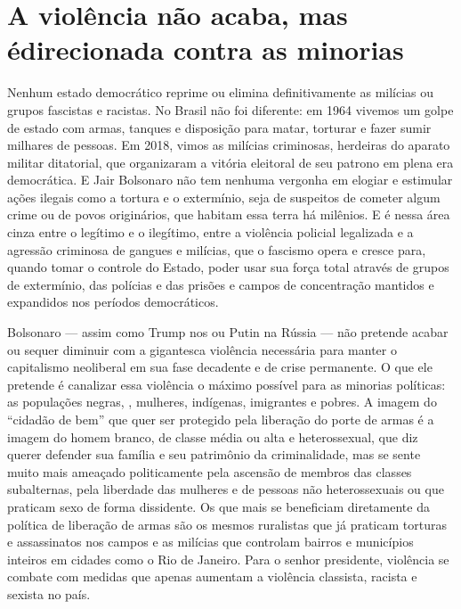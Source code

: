 \section{A violência não acaba, mas é\break direcionada contra as minorias}

Nenhum estado democrático reprime ou elimina definitivamente as milícias ou grupos fascistas e racistas. No Brasil não foi diferente: em 1964 vivemos um golpe de estado com armas, tanques e disposição para matar, torturar e fazer sumir milhares de pessoas. Em 2018, vimos as milícias criminosas, herdeiras do aparato militar ditatorial, que organizaram a vitória eleitoral de seu patrono em plena era democrática. E Jair Bolsonaro não tem nenhuma vergonha em elogiar e estimular ações ilegais como a tortura e o extermínio, seja de suspeitos de cometer algum crime ou de povos originários, que habitam essa terra há milênios. E é nessa área cinza entre o legítimo e o ilegítimo, entre a violência policial legalizada e a agressão criminosa de gangues e milícias, que o fascismo opera e cresce para, quando tomar o controle do Estado, poder usar sua força total através de grupos de extermínio, das polícias e das prisões e campos de concentração mantidos e expandidos nos períodos democráticos.

Bolsonaro --- assim como Trump nos  ou Putin na Rússia --- não pretende acabar ou sequer diminuir com a gigantesca violência necessária para manter o capitalismo neoliberal em sua fase decadente e de crise permanente. O que ele pretende é canalizar essa violência o máximo possível para as minorias políticas: as populações negras, , mulheres, indígenas, imigrantes e pobres. A imagem do ``cidadão de bem'' que quer ser protegido pela liberação do porte de armas é a imagem do homem branco, de classe média ou alta e heterossexual, que diz querer defender sua família e seu patrimônio da criminalidade, mas se sente muito mais ameaçado politicamente pela ascensão de membros das classes subalternas, pela liberdade das mulheres e de pessoas não heterossexuais ou que praticam sexo de forma dissidente. Os que mais se beneficiam diretamente da política de liberação de armas são os mesmos ruralistas que já praticam torturas e assassinatos nos campos e as milícias que controlam bairros e municípios inteiros em cidades como o Rio de Janeiro. Para o senhor presidente, violência se combate com medidas que apenas aumentam a violência classista, racista e sexista no país.

